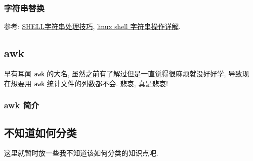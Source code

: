 \subsubsection{字符串替换}

参考: \href{https://blog.csdn.net/qq_51470638/article/details/125035162}{SHELL字符串处理技巧}, \href{https://www.cnblogs.com/gaochsh/p/6901809.html}{linux shell 字符串操作详解}.

\subsection{awk}
早有耳闻 \texttt{awk} 的大名, 虽然之前有了解过但是一直觉得很麻烦就没好好学, 导致现在想要用 \texttt{awk} 统计文件的列数都不会. 悲哀, 真是悲哀!

\subsubsection{awk 简介}

\subsection{不知道如何分类}
这里就暂时放一些我不知道该如何分类的知识点吧.

